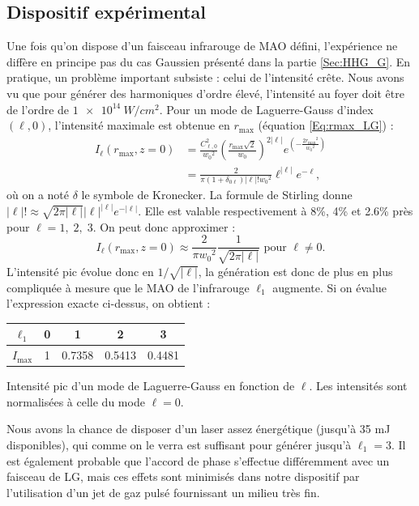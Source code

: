 \subsection{Dispositif expérimental}
\label{sec:contraintes}
Une fois qu'on dispose d'un faisceau infrarouge de MAO défini, l'expérience ne diffère en principe pas du cas Gaussien présenté dans la partie \ref{Sec:HHG_G}. En pratique, un problème important subsiste : celui de l'intensité crête. Nous avons vu que pour générer des harmoniques d'ordre élevé, l'intensité au foyer doit être de l'ordre de $\SI{1e14}{W/cm^2}$. Pour un mode de Laguerre-Gauss d'index $(\ell,0)$, l'intensité maximale est obtenue en $r_\mathrm{max}$ (équation \ref{Eq:rmax_LG}) :
\begin{align*}
I_\ell(r_\mathrm{max},z=0) &= \frac{C_{\ell,0}^2}{{w_0}^2}{\left( {\frac{r_\mathrm{max}\sqrt{2}}{{w_0}}} \right)^{2\left| \ell  \right|}}{e^{\left( { - \frac{{2{{r_\mathrm{max}}^2}}}{{{{w_0}^2}}}} \right)}}\\
&= \frac{2}{\pi(1+\delta_{0\ell})\left| \ell  \right|!{w_0}^2}\ell^{\left| \ell  \right|}{e^{-\ell}},
\end{align*}
où on a noté $\delta$ le symbole de Kronecker. La formule de Stirling donne $\left| \ell  \right|!\approx\sqrt{2\pi\left| \ell  \right|}\left| \ell  \right|^{\left| \ell  \right|}e^{-\left| \ell  \right|}$. Elle est valable respectivement à 8\%, 4\% et 2.6\% près pour $\ell=1,\;2,\;3$. On peut donc approximer :
\begin{equation*}
I_\ell(r_\mathrm{max},z=0) \approx \frac{2}{\pi{w_0}^2}\frac{1}{\sqrt{2\pi\left| \ell  \right|}}\text{ pour }\ell\neq0. 
\end{equation*}  
L'intensité pic évolue donc en $1/\sqrt{\left| \ell  \right|}$, la génération est donc de plus en plus compliquée à mesure que le MAO de l'infrarouge $\ell_{1}$ augmente. Si on évalue l'expression exacte ci-dessus, on obtient :

\begin{center}
  \begin{tabular}{| c | c | c | c | c |}
    \hline
		$\ell_{1}$ & 0 & 1 & 2 & 3 \\ \hline
    $I_{\mathrm{max}}$ & 1 & 0.7358 & 0.5413 & 0.4481 \\ \hline
  \end{tabular}
	\caption{Intensité pic d'un mode de Laguerre-Gauss en fonction de $\ell$. Les intensités sont normalisées à celle du mode $\ell = 0$.}
	\label{tab:ipeaklg}
\end{center}
Nous avons la chance de disposer d'un laser assez énergétique (jusqu'à 35 mJ disponibles), qui comme on le verra est suffisant pour générer jusqu'à $\ell_{1}=3$. Il est également probable que l'accord de phase s'effectue différemment avec un faisceau de LG, mais ces effets sont minimisés dans notre dispositif par l'utilisation d'un jet de gaz pulsé fournissant un milieu très fin.


